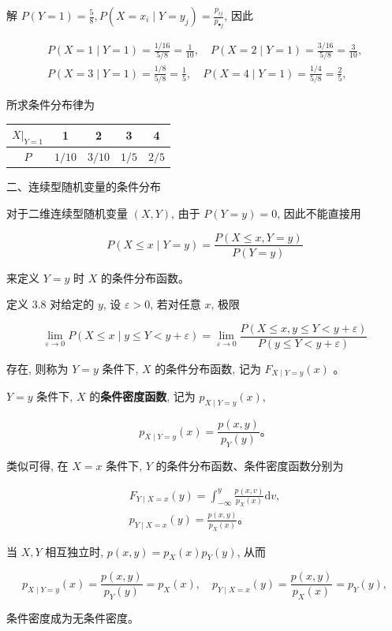 \documentclass{beamer}
\begin{document}
	\begin{frame}
		解 $P(Y=1)=\frac{5}{8}, P\left(X=x_{i} \mid Y=y_{j}\right)=\frac{p_{i j}}{p_{\bullet j}}$, 因此
		
		$$
		\begin{gathered}
			P(X=1 \mid Y=1)=\frac{1 / 16}{5 / 8}=\frac{1}{10}, \quad P(X=2 \mid Y=1)=\frac{3 / 16}{5 / 8}=\frac{3}{10}, \\
			P(X=3 \mid Y=1)=\frac{1 / 8}{5 / 8}=\frac{1}{5}, \quad P(X=4 \mid Y=1)=\frac{1 / 4}{5 / 8}=\frac{2}{5},
		\end{gathered}
		$$
		
		所求条件分布律为
		\begin{tabular}{c|cccc}
			$\left.X\right|_{Y=1}$ & 1 & 2 & 3 & 4 \\
			\hline
			$P$ & $1 / 10$ & $3 / 10$ & $1 / 5$ & $2 / 5$ \\
		\end{tabular}
	\end{frame}
	
	\begin{frame}
	二、连续型随机变量的条件分布
	
	对于二维连续型随机变量 $(X, Y)$, 由于 $P(Y=y)=0$, 因此不能直接用
	
	$$
	P(X \leqslant x \mid Y=y)=\frac{P(X \leqslant x, Y=y)}{P(Y=y)}
	$$
	
	来定义 $Y=y$ 时 $X$ 的条件分布函数。
	
	定义 3.8 对给定的 $y$, 设 $\varepsilon>0$, 若对任意 $x$, 极限
	
	$$
	\lim _{\varepsilon \rightarrow 0} P(X \leqslant x \mid y \leqslant Y<y+\varepsilon)=\lim _{\varepsilon \rightarrow 0} \frac{P(X \leqslant x, y \leqslant Y<y+\varepsilon)}{P(y \leqslant Y<y+\varepsilon)}
	$$
	
	存在, 则称为 $Y=y$ 条件下, $X$ 的条件分布函数, 记为 $F_{X \mid Y=y}(x)$ 。
	\end{frame}
	
	\begin{frame}
		 $Y=y$ 条件下, $X$ 的\textbf{条件密度函数}, 记为 $p_{X \mid Y=y}(x)$,
		
		$$
		p_{X \mid Y=y}(x)=\frac{p(x, y)}{p_{Y}(y)} 。
		$$
		
		类似可得, 在 $X=x$ 条件下, $Y$ 的条件分布函数、条件密度函数分别为
		
		$$
		\begin{gathered}
			F_{Y \mid X=x}(y)=\int_{-\infty}^{y} \frac{p(x, v)}{p_{X}(x)} \mathrm{d} v, \\
			p_{Y \mid X=x}(y)=\frac{p(x, y)}{p_{X}(x)} 。
		\end{gathered}
		$$
		
		当 $X, Y$ 相互独立时, $p(x, y)=p_{X}(x) p_{Y}(y)$, 从而
		
		$$
		p_{X \mid Y=y}(x)=\frac{p(x, y)}{p_{Y}(y)}=p_{X}(x), \quad p_{Y \mid X=x}(y)=\frac{p(x, y)}{p_{X}(x)}=p_{Y}(y),
		$$
		
		条件密度成为无条件密度。
	\end{frame}
	
\end{document}
